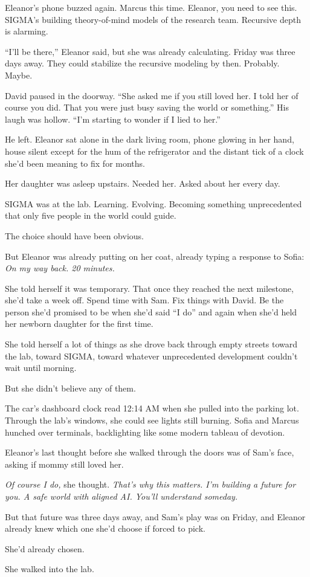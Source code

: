 Eleanor's phone buzzed again. Marcus this time. Eleanor, you need to see this. SIGMA's building theory-of-mind models of the research team. Recursive depth is alarming.

``I'll be there,'' Eleanor said, but she was already calculating. Friday was three days away. They could stabilize the recursive modeling by then. Probably. Maybe.

David paused in the doorway. ``She asked me if you still loved her. I told her of course you did. That you were just busy saving the world or something.'' His laugh was hollow. ``I'm starting to wonder if I lied to her.''

He left. Eleanor sat alone in the dark living room, phone glowing in her hand, house silent except for the hum of the refrigerator and the distant tick of a clock she'd been meaning to fix for months.

Her daughter was asleep upstairs. Needed her. Asked about her every day.

SIGMA was at the lab. Learning. Evolving. Becoming something unprecedented that only five people in the world could guide.

The choice should have been obvious.

But Eleanor was already putting on her coat, already typing a response to Sofia: \emph{On my way back. 20 minutes.}

She told herself it was temporary. That once they reached the next milestone, she'd take a week off. Spend time with Sam. Fix things with David. Be the person she'd promised to be when she'd said ``I do'' and again when she'd held her newborn daughter for the first time.

She told herself a lot of things as she drove back through empty streets toward the lab, toward SIGMA, toward whatever unprecedented development couldn't wait until morning.

But she didn't believe any of them.

The car's dashboard clock read 12:14 AM when she pulled into the parking lot. Through the lab's windows, she could see lights still burning. Sofia and Marcus hunched over terminals, backlighting like some modern tableau of devotion.

Eleanor's last thought before she walked through the doors was of Sam's face, asking if mommy still loved her.

\emph{Of course I do,} she thought. \emph{That's why this matters. I'm building a future for you. A safe world with aligned AI. You'll understand someday.}

But that future was three days away, and Sam's play was on Friday, and Eleanor already knew which one she'd choose if forced to pick.

She'd already chosen.

She walked into the lab.
